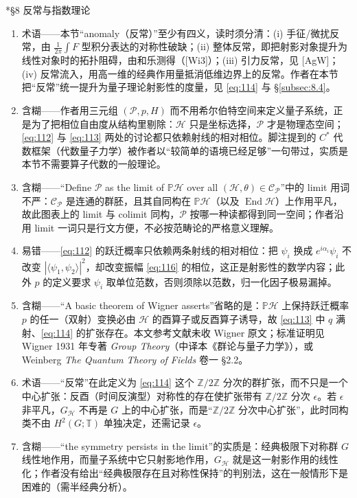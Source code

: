 \documentclass[11pt]{amsart}
\makeatletter
\def\subsection{\@startsection{subsection}{2}%
   \z@{1.25\linespacing\@plus.7\linespacing}{.5\linespacing}%
   {\normalfont\bfseries}}
\theoremstyle{definition}
\theoremstyle{remark}
\theoremstyle{plain}
\numberwithin{equation}{section}
\renewcommand{\:}{\colon}
\DeclareMathOperator{\End}{End}
\newcommand{\PP}{{\mathbb P}}
\newcommand{\TT}{\mathbb T}
\newcommand{\ZZ}{{\mathbb Z}}
\newcommand{\zmod}[1]{\ZZ/#1\ZZ}
\newcommand{\zt}{\zmod2}
\newcommand{\PH}{\PP\sH}
\newcommand{\cP}{\sC_{\sP}}
\newcommand{\sC}{\mathscr{C}}
\newcommand{\sH}{\mathscr{H}}
\newcommand{\sP}{\mathscr{P}}
\makeatother
\begin{document}
\subsection*{§8 反常与指数理论}
\begin{enumerate}[leftmargin=2.2em,itemsep=2pt,topsep=2pt]
  \item 术语——本节“anomaly（反常）”至少有四义，读时须分清：(i) 手征/微扰反常，由 $\frac{1}{2\pi}\int F$ 型积分表达的对称性破缺；(ii) 整体反常，即把射影对象提升为线性对象时的拓扑阻碍，由和乐测得（[Wi3]）；(iii) 引力反常，见 [AgW]；(iv) 反常流入，用高一维的经典作用量抵消低维边界上的反常。作者在本节把“反常”统一提升为量子理论射影性的度量，见 \eqref{eq:114} 与 §\ref{subsec:8.4}。
  \item 含糊——作者用三元组 $(\sP,p,H)$ 而不用希尔伯特空间来定义量子系统，正是为了把相位自由度从结构里剔除：$\sH$ 只是坐标选择，$\sP$ 才是物理态空间；\eqref{eq:112} 与 \eqref{eq:113} 两处的讨论都只依赖射线的相对相位。脚注提到的 $C^*$ 代数框架（代数量子力学）被作者以“较简单的语境已经足够”一句带过，实质是本节不需要算子代数的一般理论。
  \item 含糊——“Define $\sP$ as the limit of $\PH$ over all $(\sH,\theta )\in \cP$”中的 limit 用词不严：$\cP$ 是连通的群胚，且其自同构在 $\PH$（以及 $\End\sH$）上作用平凡，故此图表上的 limit 与 colimit 同构，$\sP$ 按哪一种读都得到同一空间；作者沿用 limit 一词只是行文方便，不必按范畴论的严格意义理解。
  \item 易错——\eqref{eq:112} 的跃迁概率只依赖两条射线的相对相位：把 $\psi _i$ 换成 $e^{i\alpha _i}\psi _i$ 不改变 $|\langle \psi _1,\psi _2\rangle|^2$，却改变振幅 \eqref{eq:116} 的相位，这正是射影性的数学内容；此外 $p$ 的定义要求 $\psi _i$ 取单位范数，否则须除以范数，归一化因子极易漏掉。
  \item 含糊——“A basic theorem of Wigner asserts”省略的是：$\PH$ 上保持跃迁概率 $p$ 的任一（双射）变换必由 $\sH$ 的酉算子或反酉算子诱导，故 \eqref{eq:113} 中 $q$ 满射、\eqref{eq:114} 的扩张存在。本文参考文献未收 Wigner 原文；标准证明见 Wigner 1931 年专著 \emph{Group Theory}（中译本《群论与量子力学》），或 Weinberg \emph{The Quantum Theory of Fields} 卷一 §2.2。
  \item 术语——“反常”在此定义为 \eqref{eq:114} 这个 $\zt$ 分次的群扩张，而不只是一个中心扩张：反酉（时间反演型）对称性的存在使扩张带有 $\zt$ 分次 $\epsilon $。若 $\epsilon $ 非平凡，$G_\sH$ 不再是 $G$ 上的中心扩张，而是“$\zt$ 分次中心扩张”，此时同构类不由 $H^2(G;\TT)$ 单独决定，还需记录 $\epsilon $。
  \item 含糊——“the symmetry persists in the limit”的实质是：经典极限下对称群 $G$ 线性地作用，而量子系统中它只射影地作用，$G_\sH$ 就是这一射影作用的线性化；作者没有给出“经典极限存在且对称性保持”的判别法，这在一般情形下是困难的（需半经典分析）。

\end{enumerate}
\end{document}
